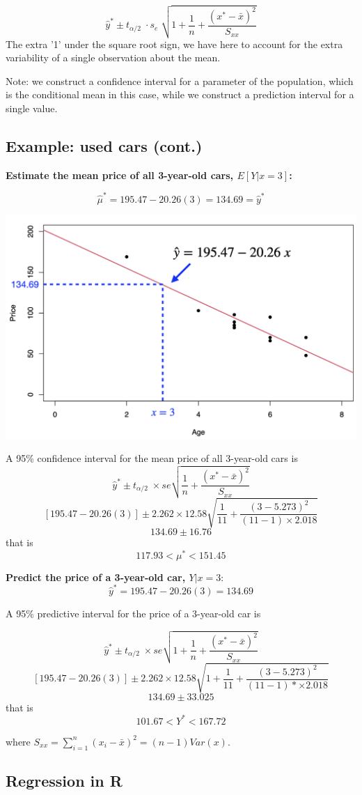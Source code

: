 \documentclass[
]{article}
\begin{document}
\[\hat{y}^* \pm t_{\alpha/2}\;\cdot s_e\;\sqrt{1+\frac{1}{n}+\frac{(x^*-\bar{x})^2}{S_{xx}}}\]
The extra '1' under the square root sign, we have here to account for
the extra variability of a single observation about the mean.

Note: we construct a confidence interval for a parameter of the
population, which is the conditional mean in this case, while we
construct a prediction interval for a single value.

\hypertarget{example-used-cars-cont.-4}{%
\subsection{Example: used cars
(cont.)}\label{example-used-cars-cont.-4}}

\textbf{Estimate the mean price of all 3-year-old cars, \(E[Y|x=3]\):}

\[\hat{\mu}^*=195.47-20.26 (3)= 134.69=\hat{y}^*\]

\begin{center}\includegraphics[width=0.4\linewidth,height=0.4\textheight]{figures/predex} \end{center}

A 95\% confidence interval for the mean price of all 3-year-old cars is
\[\hat{y}^*\pm t_{\alpha/2}\;\times se\sqrt{\frac{1}{n}+\frac{(x^*-\bar{x})^2}{S_{xx}}}\]
\[[195.47-20.26(3)]\pm 2.262\times12.58\sqrt{\frac{1}{11}+\frac{(3-5.273)^2}{(11-1)\times2.018}}\]
\[134.69\pm 16.76\] that is \[117.93<\mu^*<151.45\]

\textbf{Predict the price of a 3-year-old car, \(Y|x=3\)}:
\[\hat{y}^*=195.47-20.26 (3)= 134.69\]

A 95\% predictive interval for the price of a 3-year-old car is

\[\hat{y}^*\pm t_{\alpha/2}\;\times se\sqrt{1+\frac{1}{n}+\frac{(x^*-\bar{x})^2}{S_{xx}}}\]
\[[195.47-20.26(3)]\pm 2.262\times12.58\sqrt{1+\frac{1}{11}+\frac{(3-5.273)^2}{(11-1)*\times2.018}}\]
\[134.69\pm 33.025\] that is \[101.67<Y^*<167.72\]

where \(S_{xx}=\sum_{i=1}^{n} (x_i-\bar{x})^2=(n-1) Var(x)\).

\hypertarget{regression-in-r}{%
\subsection{Regression in R}\label{regression-in-r}}
\end{document}

